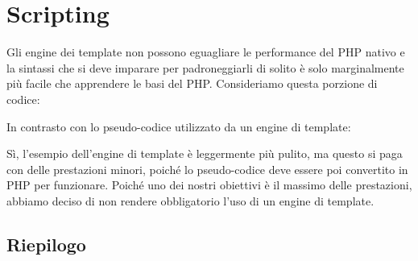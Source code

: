 \chapter{Scripting}
\label{cap:script}

Gli engine dei template non possono eguagliare le performance del \ac{PHP} nativo e la sintassi che si deve imparare per padroneggiarli di solito è solo marginalmente più facile che apprendere le basi del \ac{PHP}. Consideriamo questa porzione di codice:


In contrasto con lo pseudo-codice utilizzato da un engine di template:


Sì, l'esempio dell'engine di template è leggermente più pulito, ma questo si paga con delle prestazioni minori, poiché lo pseudo-codice deve essere poi convertito in \ac{PHP} per funzionare. Poiché uno dei nostri obiettivi è il massimo delle prestazioni, abbiamo deciso di non rendere obbligatorio l'uso di un engine di template.
\section{Riepilogo}
\omissis